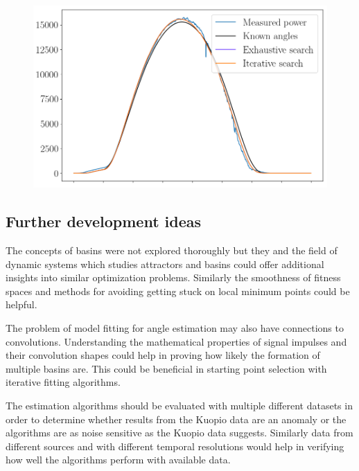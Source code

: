 \begin{figure}[!h]
\centering
\includegraphics[width=0.8\linewidth]{pics/measured_vs_simulated_vs_kuopio}
\label{measured_vs_simulated_vs_estimated_kuopio}
\end{figure}

\pagebreak
\pagebreak

\subsection{Further development ideas}
The concepts of basins were not explored thoroughly but they and the field of dynamic systems which studies attractors and basins could offer additional insights into similar optimization problems. Similarly the smoothness of fitness spaces and methods for avoiding getting stuck on local minimum points could be helpful.

The problem of model fitting for angle estimation may also have connections to convolutions. Understanding the mathematical properties of signal impulses and their convolution shapes could help in proving how likely the formation of multiple basins are. This could be beneficial in starting point selection with iterative fitting algorithms.

The estimation algorithms should be evaluated with multiple different datasets in order to determine whether results from the Kuopio data are an anomaly or the algorithms are as noise sensitive as the Kuopio data suggests. Similarly data from different sources and with different temporal resolutions would help in verifying how well the algorithms perform with available data.








